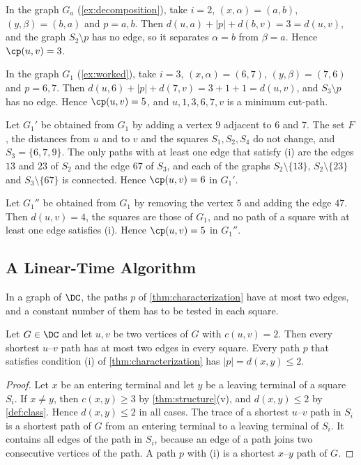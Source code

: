 \begin{example}
\label{ex:criterion}
In the graph $G_a$ (\cref{ex:decomposition}), take $i = 2$, $(x, \alpha) = (a, b)$, $(y, \beta) = (b, a)$ and $p = a, b$.
Then $d(u, a) + |p| + d(b, v) = 3 = d(u, v)$, and the graph $S_2 \setminus p$ has no edge, so it separates $\alpha = b$ from $\beta = a$.
Hence $\cp(u, v) = 3$.

In the graph $G_1$ (\cref{ex:worked}), take $i = 3$, $(x, \alpha) = (6, 7)$, $(y, \beta) = (7, 6)$ and $p = 6, 7$.
Then $d(u, 6) + |p| + d(7, v) = 3 + 1 + 1 = d(u, v)$, and $S_3 \setminus p$ has no edge.
Hence $\cp(u, v) = 5$, and $u, 1, 3, 6, 7, v$ is a minimum cut-path.

Let $G_1'$ be obtained from $G_1$ by adding a vertex $9$ adjacent to $6$ and $7$.
The set $F$, the distances from $u$ and to $v$ and the squares $S_1, S_2, S_4$ do not change, and $S_3 = \{6, 7, 9\}$.
The only paths with at least one edge that satisfy (i) are the edges $13$ and $23$ of $S_2$ and the edge $67$ of $S_3$, and each of the graphs $S_2 \setminus \{13\}$, $S_2 \setminus \{23\}$ and $S_3 \setminus \{67\}$ is connected.
Hence $\cp(u, v) = 6$ in $G_1'$.

Let $G_1''$ be obtained from $G_1$ by removing the vertex $5$ and adding the edge $47$.
Then $d(u, v) = 4$, the squares are those of $G_1$, and no path of a square with at least one edge satisfies (i).
Hence $\cp(u, v) = 5$ in $G_1''$.
\end{example}

\subsection{A Linear-Time Algorithm}
\label{sec:algorithm}

In a graph of $\DC$, the paths $p$ of \cref{thm:characterization} have at most two edges, and a constant number of them has to be tested in each square.

\begin{corollary}
\label{cor:two-edges}
Let $G \in \DC$ and let $u, v$ be two vertices of $G$ with $c(u, v) = 2$.
Then every shortest $u$--$v$ path has at most two edges in every square.
Every path $p$ that satisfies condition (i) of \cref{thm:characterization} has $|p| = d(x, y) \leq 2$.
\end{corollary}

\begin{proof}
Let $x$ be an entering terminal and let $y$ be a leaving terminal of a square $S_i$.
If $x \neq y$, then $c(x, y) \geq 3$ by \cref{thm:structure}(v), and $d(x, y) \leq 2$ by \cref{def:class}.
Hence $d(x, y) \leq 2$ in all cases.
The trace of a shortest $u$--$v$ path in $S_i$ is a shortest path of $G$ from an entering terminal to a leaving terminal of $S_i$.
It contains all edges of the path in $S_i$, because an edge of a path joins two consecutive vertices of the path.
A path $p$ with (i) is a shortest $x$--$y$ path of $G$.
\end{proof}

